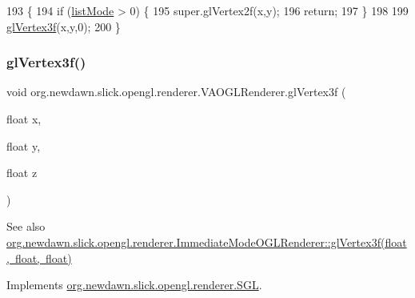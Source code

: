 \begin{DoxyCode}
193                                              \{
194         \textcolor{keywordflow}{if} (\mbox{\hyperlink{classorg_1_1newdawn_1_1slick_1_1opengl_1_1renderer_1_1_v_a_o_g_l_renderer_afee8361b229cada04ad11d9ee44c7284}{listMode}} > 0) \{
195             super.glVertex2f(x,y);
196             \textcolor{keywordflow}{return};
197         \}
198         
199         \mbox{\hyperlink{classorg_1_1newdawn_1_1slick_1_1opengl_1_1renderer_1_1_v_a_o_g_l_renderer_a4ca20d3414cf85fb5b4daf4a5de39685}{glVertex3f}}(x,y,0);
200     \}
\end{DoxyCode}
\mbox{\label{classorg_1_1newdawn_1_1slick_1_1opengl_1_1renderer_1_1_v_a_o_g_l_renderer_a4ca20d3414cf85fb5b4daf4a5de39685}} 
\subsubsection{\texorpdfstring{gl\+Vertex3f()}{glVertex3f()}}
{\footnotesize\ttfamily void org.\+newdawn.\+slick.\+opengl.\+renderer.\+V\+A\+O\+G\+L\+Renderer.\+gl\+Vertex3f (\begin{DoxyParamCaption}\item[{float}]{x,  }\item[{float}]{y,  }\item[{float}]{z }\end{DoxyParamCaption})\hspace{0.3cm}{\ttfamily [inline]}}

\begin{DoxySeeAlso}{See also}
\mbox{\hyperlink{classorg_1_1newdawn_1_1slick_1_1opengl_1_1renderer_1_1_immediate_mode_o_g_l_renderer_ab4aa458f50e3ba4f3abeb2818291ea4d}{org.\+newdawn.\+slick.\+opengl.\+renderer.\+Immediate\+Mode\+O\+G\+L\+Renderer\+::gl\+Vertex3f(float, float, float)}} 
\end{DoxySeeAlso}


Implements \mbox{\hyperlink{interfaceorg_1_1newdawn_1_1slick_1_1opengl_1_1renderer_1_1_s_g_l_ae2baba1598d723f9059f45e0871be822}{org.\+newdawn.\+slick.\+opengl.\+renderer.\+S\+GL}}.


